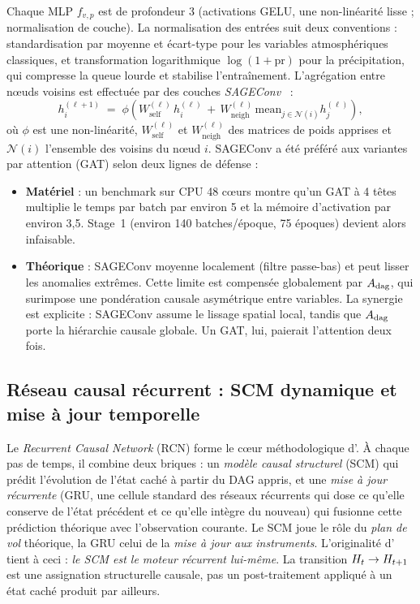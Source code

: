 Chaque MLP $f_{v,p}$ est de profondeur 3 (activations GELU, une non-linéarité lisse ; normalisation de couche). La normalisation des entrées suit deux conventions : standardisation par moyenne et écart-type pour les variables atmosphériques classiques, et transformation logarithmique $\log(1 + \mathrm{pr})$ pour la précipitation, qui compresse la queue lourde et stabilise l'entraînement. L'agrégation entre nœuds voisins est effectuée par des couches \emph{SAGEConv}~\cite{hamilton_sage_2017} :
\begin{equation}
  h_i^{(\ell+1)} \;=\; \phi\!\left( W_{\mathrm{self}}^{(\ell)}\, h_i^{(\ell)} \,+\, W_{\mathrm{neigh}}^{(\ell)}\, \mathrm{mean}_{j \in \mathcal{N}(i)} h_j^{(\ell)} \right),
  \label{eq:sageconv}
\end{equation}
où $\phi$ est une non-linéarité, $W_{\mathrm{self}}^{(\ell)}$ et $W_{\mathrm{neigh}}^{(\ell)}$ des matrices de poids apprises et $\mathcal{N}(i)$ l'ensemble des voisins du nœud $i$. SAGEConv a été préféré aux variantes par attention (GAT) selon deux lignes de défense :
\begin{itemize}[leftmargin=1.2em, itemsep=2pt]
    \item \textbf{Matériel} : un benchmark sur CPU 48 cœurs montre qu'un GAT à 4 têtes multiplie le temps par batch par environ 5 et la mémoire d'activation par environ 3,5. Stage~1 (environ 140 batches/époque, 75 époques) devient alors infaisable.
    \item \textbf{Théorique} : SAGEConv moyenne localement (filtre passe-bas) et peut lisser les anomalies extrêmes. Cette limite est compensée globalement par $A_{\mathrm{dag}}$, qui surimpose une pondération causale asymétrique entre variables. La synergie est explicite : SAGEConv assume le lissage spatial local, tandis que $A_{\mathrm{dag}}$ porte la hiérarchie causale globale. Un GAT, lui, paierait l'attention deux fois.
\end{itemize}

\subsection{Réseau causal récurrent : SCM dynamique et mise à jour temporelle}
\label{sec:oracle-rcn}

Le \emph{Recurrent Causal Network} (RCN) forme le cœur méthodologique d'\Oracle{}. À chaque pas de temps, il combine deux briques : un \emph{modèle causal structurel} (SCM) qui prédit l'évolution de l'état caché à partir du DAG appris, et une \emph{mise à jour récurrente} (GRU, une cellule standard des réseaux récurrents qui dose ce qu'elle conserve de l'état précédent et ce qu'elle intègre du nouveau) qui fusionne cette prédiction théorique avec l'observation courante. Le SCM joue le rôle du \emph{plan de vol} théorique, la GRU celui de la \emph{mise à jour aux instruments}. L'originalité d'\Oracle{} tient à ceci : \emph{le SCM est le moteur récurrent lui-même}. La transition $H_t \to H_{t+1}$ est une assignation structurelle causale, pas un post-traitement appliqué à un état caché produit par ailleurs.

